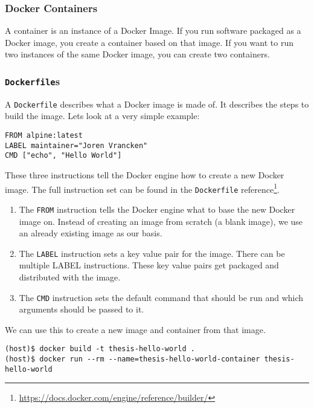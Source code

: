 \subsubsection{Docker Containers}
A container is an instance of a Docker Image. If you run software packaged as a Docker image, you create a container based on that image. If you want to run two instances of the same Docker image, you can create two containers.

\subsubsection{\lstinline{Dockerfile}s}
A \lstinline{Dockerfile} describes what a Docker image is made of. It describes the steps to build the image. Lets look at a very simple example:

\begin{lstlisting}[caption={Very Basic \lstinline{Dockerfile}},label={listing:dockerfile-simple},captionpos=b]
FROM alpine:latest
LABEL maintainer="Joren Vrancken"
CMD ["echo", "Hello World"]
\end{lstlisting}

These three instructions tell the Docker engine how to create a new Docker image.
The full instruction set can be found in the \lstinline{Dockerfile} reference\footnote{\url{https://docs.docker.com/engine/reference/builder/}}.

\begin{enumerate}
    \item The \lstinline{FROM} instruction tells the Docker engine what to base the new Docker image on. Instead of creating an image from scratch (a blank image), we use an already existing image as our basis.

    \item The \lstinline{LABEL} instruction sets a key value pair for the image. There can be multiple LABEL instructions. These key value pairs get packaged and distributed with the image.

    \item The \lstinline{CMD} instruction sets the default command that should be run and which arguments should be passed to it.
\end{enumerate}

We can use this to create a new image and container from that image.
\begin{lstlisting}[caption={Creating a Docker container from a \lstinline{Dockerfile}},label={listing:create-container},captionpos=b]
(host)$ docker build -t thesis-hello-world .
(host)$ docker run --rm --name=thesis-hello-world-container thesis-hello-world
\end{lstlisting}

